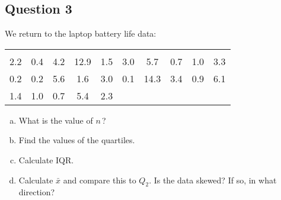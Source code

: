 \subsection{Question 3}
\begin{frame}{\bf {}}
We return to the laptop battery life data:\\
\begin{center}
\begin{tabular}{|cccccccccc|}
\hline
&&&&&&&&&\\[-0.4cm]
2.2 & 0.4 & 4.2 & 12.9 & 1.5 & 3.0 & 5.7  & 0.7 & 1.0 & 3.3 \\
0.2 & 0.2 & 5.6 &  1.6 & 3.0 & 0.1 & 14.3 & 3.4 & 0.9 & 6.1 \\
1.4 & 1.0 & 0.7 & 5.4  & 2.3 &&&&&\\
\hline
\end{tabular}
\end{center}
\begin{enumerate}[a)]\itemsep0.3cm
\item What is the value of $n$\,?
\item Find the values of the quartiles.
\item Calculate IQR.
\item Calculate $\bar x$ and compare this to $Q_2$. Is the data skewed? If so, in what direction?
\end{enumerate}
\end{frame}




